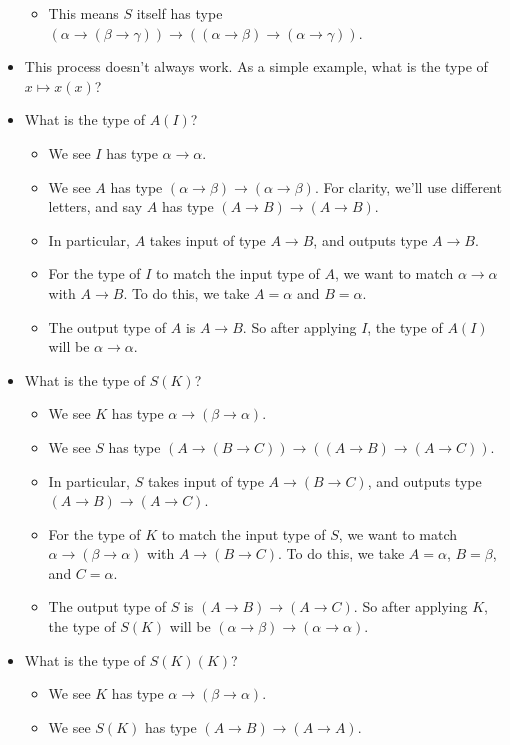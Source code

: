 \documentclass[11pt,paper=letter]{scrartcl}
\begin{document}
\begin{itemize}[leftmargin=*]
\begin{itemize}
\item This means $S$ itself has type $\left(\alpha \to (\beta \to \gamma)\right) \to \left((\alpha \to \beta) \to \left(\alpha \to \gamma\right)\right)$.
\end{itemize}
\item This process doesn't always work. As a simple example, what is the type of $x \mapsto x(x)$?
\item What is the type of $A(I)$?
\begin{itemize}
\item We see $I$ has type $\alpha \to \alpha$.
\item We see $A$ has type $(\alpha \to \beta) \to (\alpha \to \beta)$. For clarity, we'll use different letters, and say $A$ has type $(A \to B) \to (A \to B)$.
\item In particular, $A$ takes input of type $A \to B$, and outputs type $A \to B$.
\item For the type of $I$ to match the input type of $A$, we want to match $\alpha \to \alpha$ with $A \to B$. To do this, we take $A = \alpha$ and $B = \alpha$.
\item The output type of $A$ is $A \to B$. So after applying $I$, the type of $A(I)$ will be $\alpha \to \alpha$.
\end{itemize}
\item What is the type of $S(K)$?
\begin{itemize}
\item We see $K$ has type $\alpha \to (\beta \to \alpha)$.
\item We see $S$ has type $\left(A \to (B \to C)\right) \to \left((A \to B) \to \left(A \to C\right)\right)$.
\item In particular, $S$ takes input of type $A \to (B \to C)$, and outputs type $(A \to B) \to (A \to C)$.
\item For the type of $K$ to match the input type of $S$, we want to match $\alpha \to (\beta \to \alpha)$ with $A \to (B \to C)$. To do this, we take $A = \alpha$, $B = \beta$, and $C = \alpha$.
\item The output type of $S$ is $(A \to B) \to (A \to C)$. So after applying $K$, the type of $S(K)$ will be $(\alpha \to \beta) \to (\alpha \to \alpha)$.
\end{itemize}
\item What is the type of $S(K)(K)$?
\begin{itemize}
\item We see $K$ has type $\alpha \to (\beta \to \alpha)$.
\item We see $S(K)$ has type $(A \to B) \to (A \to A)$.

\end{itemize}
\end{itemize}
\end{document}
